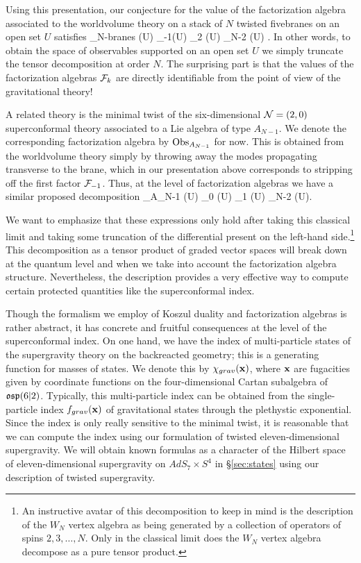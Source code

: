 Using this presentation, our conjecture for the value of the factorization algebra associated to the worldvolume theory on a stack of $N$ twisted fivebranes on an open set $U$ satisfies
\beqn\label{eqn:finiteTensor}
\Obs_{N-branes} (U) \simeq \cF_{-1}(U) \otimes \cF_2 (U) \otimes \cdots \otimes \cF_{N-2} (U) .
\eeqn
In other words, to obtain the space of observables supported on an open set $U$ we simply truncate the tensor decomposition at order $N$.
The surprising part is that the values of the factorization algebras $\mathcal F_k$ are directly identifiable from the point of view of the gravitational theory!

A related theory is the minimal twist of the six-dimensional $\mathcal N=(2,0)$ superconformal theory associated to a Lie algebra of type $A_{N-1}$.
We denote the corresponding factorization algebra by $\operatorname{Obs}_{A_{N-1}}$ for now. 
This is obtained from the worldvolume theory simply by throwing away the modes propagating transverse to the brane, which in our presentation above corresponds to stripping off the first factor $\mathcal F_{-1}$. 
Thus, at the level of factorization algebras we have a similar proposed decomposition
\beqn
\label{eqn:AN-1}
\Obs_{A_{N-1}} (U) \simeq \cF_0 (U) \otimes \cF_1 (U) \otimes \cdots \otimes \cF_{N-2} (U).
\eeqn

We want to emphasize that these expressions only hold after taking this classical limit and taking some truncation of the differential present on the left-hand side.\footnote{An instructive avatar of this decomposition to keep in mind is the description of the $W_N$ vertex algebra as being generated by a collection of operators of spins $2,3,\ldots, N$.
Only in the classical limit does the $W_N$ vertex algebra decompose as a pure tensor product.}
This decomposition as a tensor product of graded vector spaces will break down at the quantum level and when we take into account the factorization algebra structure.
Nevertheless, the description provides a very effective way to compute certain protected quantities like the superconformal index.

Though the formalism we employ of Koszul duality and factorization algebras is rather abstract, it has concrete and fruitful consequences at the level of the superconformal index.
On one hand, we have the index of multi-particle states of the supergravity theory on the backreacted geometry; this is a generating function for masses of states. We denote this by $\chi_{grav}({\bf x})$, where ${\bf x}$ are fugacities given by coordinate functions on the four-dimensional Cartan subalgebra of~$\mathfrak{osp}(6|2)$.
Typically, this multi-particle index can be obtained from the single-particle index $f_{grav}({\bf x})$ of gravitational states through the plethystic exponential. 
Since the index is only really sensitive to the minimal twist, it is reasonable that we can compute the index using our formulation of twisted eleven-dimensional supergravity.
We will obtain known formulas as a character of the Hilbert space of eleven-dimensional supergravity on $AdS_7\times S^{4}$ in \S\ref{sec:states} using our description of twisted supergravity.

